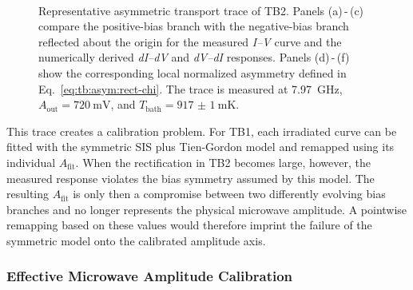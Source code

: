         \begin{figure}[t]
            \centering
            \hfill
            \hfill
            \\
            \hfill
            \hfill
            \caption{
                Representative asymmetric transport trace of TB2. Panels (a)\,-\,(c) compare the positive-bias branch with the negative-bias branch reflected about the origin for the measured \textit{I--V} curve and the numerically derived \textit{dI--dV} and \textit{dV--dI} responses. Panels (d)\,-\,(f) show the corresponding local normalized asymmetry defined in Eq.~\eqref{eq:tb:asym:rect-chi}. The trace is measured at \qty{7.97}{\giga\hertz}, $A_\mathrm{out}=\qty{720}{\milli\volt}$, and $T_\mathrm{bath}=\qty{917(1)}{\milli\kelvin}$.
                }
            \label{fig:tb:asym:irradiation:single-asym}
        \end{figure}

        This trace creates a calibration problem. For TB1, each irradiated curve can be fitted with the symmetric SIS plus Tien-Gordon model and remapped using its individual $A_\mathrm{fit}$. When the rectification in TB2 becomes large, however, the measured response violates the bias symmetry assumed by this model. The resulting $A_\mathrm{fit}$ is only then a compromise between two differently evolving bias branches and no longer represents the physical microwave amplitude. A pointwise remapping based on these values would therefore imprint the failure of the symmetric model onto the calibrated amplitude axis.

    \subsubsection*{Effective Microwave Amplitude Calibration}
    \label{subsec:tb:asym:amplitude-calibration}

